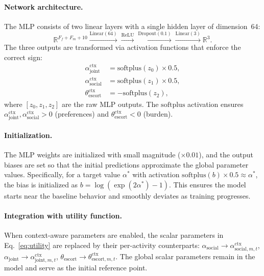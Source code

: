 \documentclass[11pt,a4paper]{article}
\newcommand{\R}{\mathbb{R}}
\newcommand{\softplus}{\mathrm{softplus}}
\begin{document}
\paragraph{Network architecture.}
The MLP consists of two linear layers with a single hidden layer of dimension~64:
\begin{equation}
    \R^{F_f + F_m + 10} \xrightarrow{\text{Linear}(64)} \xrightarrow{\text{ReLU}} \xrightarrow{\text{Dropout}(0.1)} \xrightarrow{\text{Linear}(3)} \R^{3}.
    \label{eq:mlp_arch}
\end{equation}
The three outputs are transformed via activation functions that enforce the correct sign:
\begin{align}
    \alpha_{\mathrm{joint}}^{\mathrm{ctx}} &= \softplus(z_0) \times 0.5, \label{eq:ctx_joint} \\
    \alpha_{\mathrm{social}}^{\mathrm{ctx}} &= \softplus(z_1) \times 0.5, \label{eq:ctx_social} \\
    \theta_{\mathrm{escort}}^{\mathrm{ctx}} &= -\softplus(z_2), \label{eq:ctx_escort}
\end{align}
where $[z_0, z_1, z_2]$ are the raw MLP outputs.
The $\softplus$ activation ensures $\alpha_{\mathrm{joint}}^{\mathrm{ctx}}, \alpha_{\mathrm{social}}^{\mathrm{ctx}} > 0$ (preferences) and $\theta_{\mathrm{escort}}^{\mathrm{ctx}} < 0$ (burden).

\paragraph{Initialization.}
The MLP weights are initialized with small magnitude ($\times 0.01$), and the output biases are set so that the initial predictions approximate the global parameter values.
Specifically, for a target value $\alpha^*$ with activation $\softplus(b) \times 0.5 \approx \alpha^*$, the bias is initialized as $b = \log(\exp(2\alpha^*) - 1)$.
This ensures the model starts near the baseline behavior and smoothly deviates as training progresses.

\paragraph{Integration with utility function.}
When context-aware parameters are enabled, the scalar parameters in Eq.~\eqref{eq:utility} are replaced by their per-activity counterparts:
$\alpha_{\mathrm{social}} \to \alpha_{\mathrm{social},m,t}^{\mathrm{ctx}}$,
$\alpha_{\mathrm{joint}} \to \alpha_{\mathrm{joint},m,t}^{\mathrm{ctx}}$,
$\theta_{\mathrm{escort}} \to \theta_{\mathrm{escort},m,t}^{\mathrm{ctx}}$.
The global scalar parameters remain in the model and serve as the initial reference point.
\end{document}
